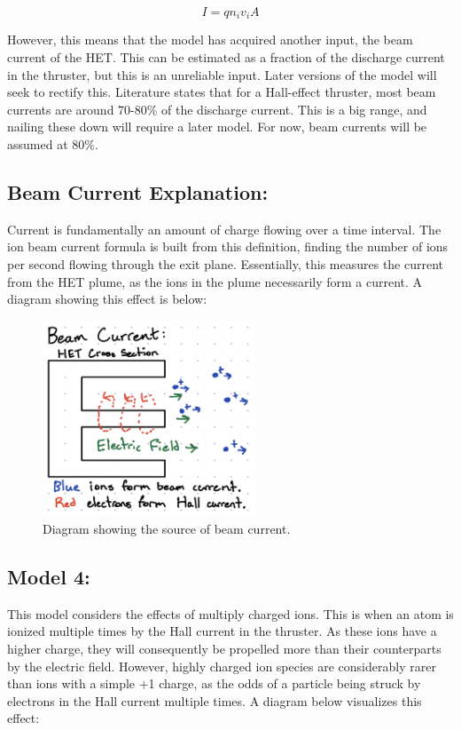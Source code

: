 \documentclass[letterpaper, 10 pt, conference]{ieeeconf}  %
\begin{document}
\begin{equation} \label{eq:11}
I = qn_iv_iA
\end{equation}

However, this means that the model has acquired another input, the beam current of the HET. This can be estimated as a fraction of the discharge current in the thruster, but this is an unreliable input. Later versions of the model will seek to rectify this. Literature states that for a Hall-effect thruster, most beam currents are around 70-80\% of the discharge current. This is a big range, and nailing these down will require a later model. For now, beam currents will be assumed at 80\%.

\subsection{Beam Current Explanation:}
Current is fundamentally an amount of charge flowing over a time interval. The ion beam current formula is built from this definition, finding the number of ions per second flowing through the exit plane. Essentially, this measures the current from the HET plume, as the ions in the plume necessarily form a current. A diagram showing this effect is below:

\begin{figure}[H]
      \centering
      \includegraphics[width=2.5in]{Images/b_cur.png}
      \caption{Diagram showing the source of beam current.}
      \label{fig:4}
\end{figure}

\subsection{Model 4:}
This model considers the effects of multiply charged ions. This is when an atom is ionized multiple times by the Hall current in the thruster. As these ions have a higher charge, they will consequently be propelled more than their counterparts by the electric field. However, highly charged ion species are considerably rarer than ions with a simple +1 charge, as the odds of a particle being struck by electrons in the Hall current multiple times. A diagram below visualizes this effect:
\end{document}
